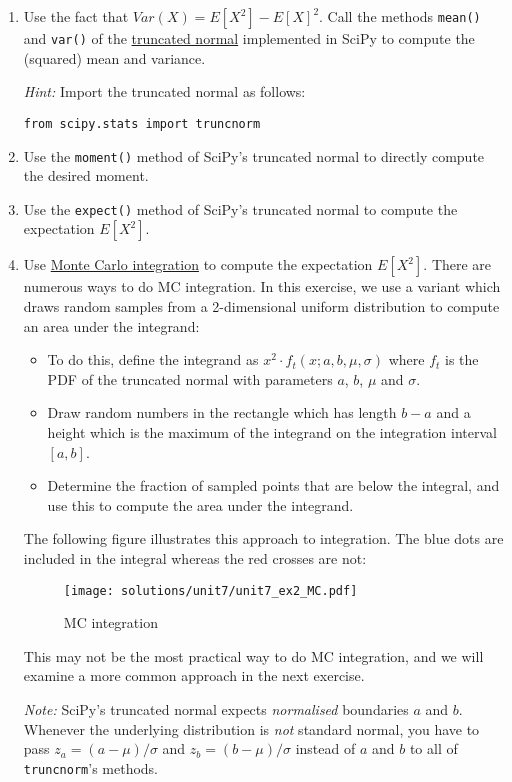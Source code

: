 \documentclass[10pt]{scrartcl}
\providecommand{\tightlist}{%
      \setlength{\itemsep}{0pt}\setlength{\parskip}{0pt}}
\begin{document}
\begin{enumerate}
\def\labelenumi{\arabic{enumi}.}
\item
  Use the fact that \(Var(X) = E[X^2] - E[X]^2\). Call the methods
  \texttt{mean()} and \texttt{var()} of the
  \href{https://docs.scipy.org/doc/scipy/reference/generated/scipy.stats.truncnorm.html}{truncated
  normal} implemented in SciPy to compute the (squared) mean and
  variance.

  \emph{Hint:} Import the truncated normal as follows:

\begin{verbatim}
from scipy.stats import truncnorm
\end{verbatim}
\item
  Use the \texttt{moment()} method of SciPy's truncated normal to
  directly compute the desired moment.
\item
  Use the \texttt{expect()} method of SciPy's truncated normal to
  compute the expectation \(E[X^2]\).
\item
  Use \href{https://en.wikipedia.org/wiki/Monte_Carlo_integration}{Monte
  Carlo integration} to compute the expectation \(E[X^2]\). There are
  numerous ways to do MC integration. In this exercise, we use a variant
  which draws random samples from a 2-dimensional uniform distribution to
  compute an area under the integrand:

  \begin{itemize}
  \tightlist
  \item
    To do this, define the integrand as
    \(x^2 \cdot f_t(x;a,b,\mu,\sigma)\) where \(f_t\) is the PDF of the
    truncated normal with parameters \(a\), \(b\), \(\mu\) and
    \(\sigma\).
  \item
    Draw random numbers in the rectangle which has length \(b-a\) and a
    height which is the maximum of the integrand on the integration
    interval \([a,b]\).
  \item
    Determine the fraction of sampled points that are below the
    integral, and use this to compute the area under the integrand.
  \end{itemize}

  The following figure illustrates this approach to integration. The
  blue dots are included in the integral whereas the red crosses are
  not:

  \begin{figure}
  \centering
  \texttt{[image: solutions/unit7/unit7\_ex2\_MC.pdf]}
  \caption{MC integration}
  \end{figure}

  This may not be the most practical way to do MC integration, and we
  will examine a more common approach in the next exercise.

  \emph{Note:} SciPy's truncated normal expects \emph{normalised}
  boundaries \(a\) and \(b\). Whenever the underlying distribution is
  \emph{not} standard normal, you have to pass \(z_a = (a-\mu)/\sigma\)
  and \(z_b = (b-\mu)/\sigma\) instead of \(a\) and \(b\) to all of
  \texttt{truncnorm}'s methods.
\end{enumerate}
\end{document}

